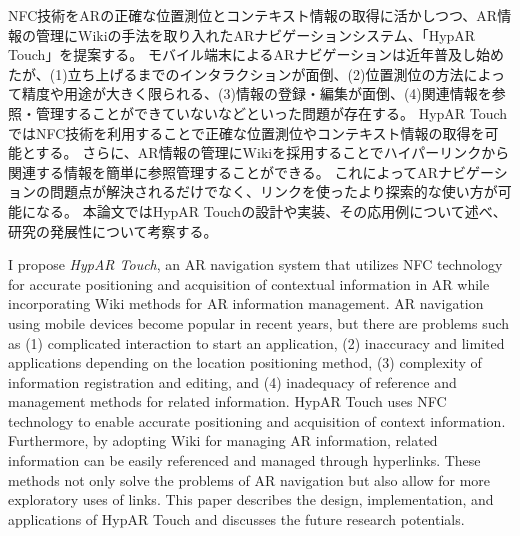 


\begin{jabstract}
NFC技術をARの正確な位置測位とコンテキスト情報の取得に活かしつつ、AR情報の管理にWikiの手法を取り入れたARナビゲーションシステム、「HypAR Touch」を提案する。
モバイル端末によるARナビゲーションは近年普及し始めたが、(1)立ち上げるまでのインタラクションが面倒、(2)位置測位の方法によって精度や用途が大きく限られる、(3)情報の登録・編集が面倒、(4)関連情報を参照・管理することができていないなどといった問題が存在する。
HypAR TouchではNFC技術を利用することで正確な位置測位やコンテキスト情報の取得を可能とする。
さらに、AR情報の管理にWikiを採用することでハイパーリンクから関連する情報を簡単に参照管理することができる。
これによってARナビゲーションの問題点が解決されるだけでなく、リンクを使ったより探索的な使い方が可能になる。
本論文ではHypAR Touchの設計や実装、その応用例について述べ、研究の発展性について考察する。
\end{jabstract}



\begin{eabstract}
I propose \textit{HypAR Touch}, an AR navigation system that utilizes NFC technology for accurate positioning and acquisition of contextual information in AR while incorporating Wiki methods for AR information management. 
AR navigation using mobile devices become popular in recent years, but there are problems such as (1) complicated interaction to start an application, (2) inaccuracy and limited applications depending on the location positioning method, (3) complexity of information registration and editing, and (4) inadequacy of reference and management methods for related information. 
HypAR Touch uses NFC technology to enable accurate positioning and acquisition of context information. 
Furthermore, by adopting Wiki for managing AR information, related information can be easily referenced and managed through hyperlinks. 
These methods not only solve the problems of AR navigation but also allow for more exploratory uses of links.
This paper describes the design, implementation, and applications of HypAR Touch and discusses the future research potentials.
\end{eabstract}
